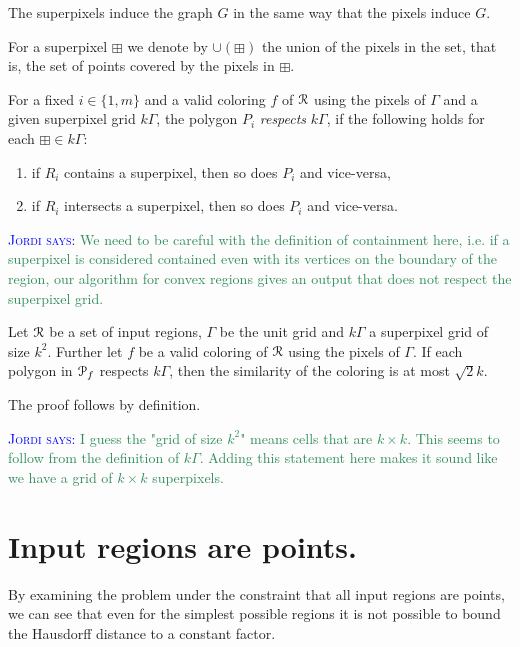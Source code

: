 \documentclass[a4paper,UKenglish,cleveref]{lipics-v2019}
\newcommand{\mremark}[3]{\textcolor{blue}{\textsc{#1 #2:}} \textcolor{SeaGreen}{\textsf{#3}}}
\newcommand{\maarten}[2][says]{\mremark{Maarten}{#1}{#2}}
\newcommand{\jordi}[2][says]{\mremark{Jordi}{#1}{#2}}
\newcommand{\pix}{\scalebox{0.6}{$\square$}}
\newcommand{\spix}{\boxplus}
\begin{document}
The superpixels induce the graph $G$ in the same way that the pixels induce $G$.

For a superpixel $\spix$ we denote by $\cup(\spix)$ the union of the pixels in the set, that is, the set of points covered by the pixels in $\spix$.

\begin{definition}
For a fixed $i\in \{1, m\}$ and a valid coloring $f$ of $\cal R$ using the pixels of $\Gamma$ and a given superpixel grid $k\Gamma$, the polygon $P_i$ \emph{respects} $k\Gamma$, if the following holds for each $\spix\in k\Gamma$:
\begin{enumerate}
	\item if $R_i$ contains a superpixel, then so does $P_i$ and vice-versa,
	\item if $R_i$ intersects a superpixel, then so does $P_i$ and vice-versa.
\end{enumerate}
\end{definition}

\jordi{We need to be careful with the definition of containment here, i.e. if a superpixel is considered contained even with its vertices on the boundary of the region, our algorithm for convex regions gives an output that does not respect the superpixel grid.}

\begin{lemma}\label{lem:respect_means_bound}
Let $\cal R$ be a set of input regions, $\Gamma$ be the unit grid and $k\Gamma$ a superpixel grid of size $k^2$. Further let $f$ be a valid coloring of $\cal R$ using the pixels of $\Gamma$.
If each polygon in ${\cal P}_f$ respects $k\Gamma$, then the similarity of the coloring is at most $\sqrt{2}k$.
\end{lemma}
The proof follows by definition.

\jordi{I guess the "grid of size $k^2$" means cells that are $k \times k$. This seems to follow from the definition of $k\Gamma$. Adding this statement here makes it sound like we have a grid of $k \times k$ superpixels.}

\section{Input regions are points.}
\label{sec:points}
By examining the problem under the constraint that all input regions are points, we can see that even for the simplest possible regions it is not possible to bound the Hausdorff distance to a constant factor.
\end{document}
